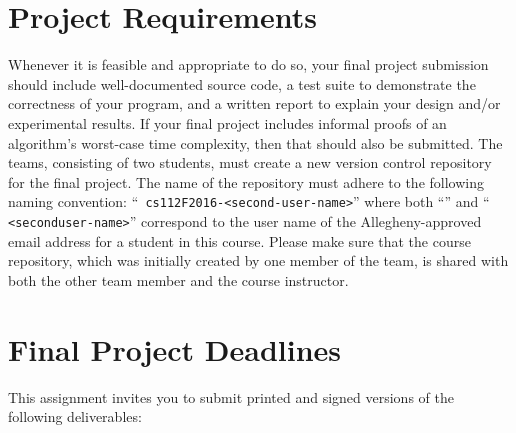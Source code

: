 \vspace*{-.15in}

\section*{Project Requirements}

Whenever it is feasible and appropriate to do so, your final project submission should include well-documented source
code, a test suite to demonstrate the correctness of your program, and a written report to explain your design and/or
experimental results. If your final project includes informal proofs of an algorithm's worst-case time complexity, then
that should also be submitted. The teams, consisting of two students, must create a new version control repository for
the final project. The name of the repository must adhere to the following naming convention: ``{\tt
cs112F2016-<second-user-name>}'' where both ``{\tt <first-user-name>}'' and ``{\tt
<second\-user-name>}'' correspond to the user name of the Allegheny-approved email address for a student in this course.
Please make sure that the course repository, which was initially created by one member of the team, is shared with both
the other team member and the course instructor.

\section*{Final Project Deadlines}

This assignment invites you to submit printed and signed versions of the following deliverables:

